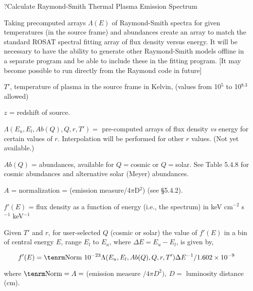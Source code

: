 \par\vfill\eject
 
\??Calculate Raymond-Smith Thermal Plasma Emission Spectrum

{\listlist
 

Taking precomputed arrays $\Lambda (E)$ of Raymond-Smith spectra for given temperatures
(in the source frame) and abundances create an array to match the standard
ROSAT spectral fitting array of flux density versus energy.
It will be necessary to have
the ability to generate other Raymond-Smith models offline in a separate program
and be able to include these in the fitting program.  [It may become possible
to run directly from the Raymond code in future]

 
$T'$, temperature of plasma in the source frame in Kelvin, (values from 10$^{5}$ to
10$^{8.3}$ allowed)

$z$ = redshift of source.

$\Lambda(E_u,E_l,Ab(Q),Q,r,T') =$ pre-computed arrays of flux density
{\it vs} energy
for certain values of $r$. Interpolation will be performed for other
$r$ values.
(Not yet available.)

$Ab(Q)$ = abundances, available for $Q=$cosmic or $Q=$solar.  See Table 5.4.8
for cosmic abundances and alternative solar (Meyer) abundances.
 
$A$ = normalization = (emission measure/4$\pi$D$^2$) (see \S5.4.2).


$f'(E)$ = flux density as a function of energy (i.e., the spectrum) in
keV cm$^{-2}$ s$^{-1}$ keV$^{-1}$

 
Given $T'$ and $r$, for user-selected $Q$ (cosmic or solar) the value of $f'(E)$
in a bin of central energy $E$, range $E_l$ to $E_u$, where 
$\Delta E=E_u - E_l$, is given by,

}

$$f'(E) = {\rm Norm}~10^{-23} \Lambda(E_{u},E_{l}, Ab(Q),Q,r,T')\Delta
E^{-1} / 1.602 \times 10^{-9}$$

{\listlist

where ${\rm Norm} = A =$ (emission measure $/ 4\pi D^2),
~D =$ luminosity distance (cm).

}

\vfill\eject
\noindent
{}
 
